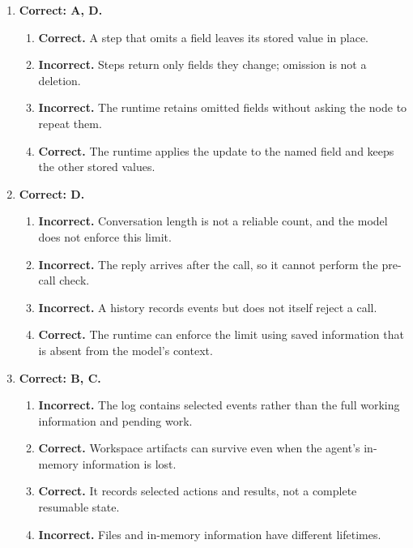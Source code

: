 \begin{enumerate}[start=11,itemsep=0.7\baselineskip]
\item[{\hyperref[exercise:11]{11.}}] \begin{minipage}[t]{\linewidth}
\textbf{Correct: A, D.}
\begin{enumerate}[label=\textnormal{(\Alph*)},leftmargin=*,itemsep=0pt]
\item \textbf{Correct.} A step that omits a field leaves its stored value in place.
\item \textbf{Incorrect.} Steps return only fields they change; omission is not a deletion.
\item \textbf{Incorrect.} The runtime retains omitted fields without asking the node to repeat them.
\item \textbf{Correct.} The runtime applies the update to the named field and keeps the other stored values.
\end{enumerate}
\end{minipage}

\item[{\hyperref[exercise:12]{12.}}] \begin{minipage}[t]{\linewidth}
\textbf{Correct: D.}
\begin{enumerate}[label=\textnormal{(\Alph*)},leftmargin=*,itemsep=0pt]
\item \textbf{Incorrect.} Conversation length is not a reliable count, and the model does not enforce this limit.
\item \textbf{Incorrect.} The reply arrives after the call, so it cannot perform the pre-call check.
\item \textbf{Incorrect.} A history records events but does not itself reject a call.
\item \textbf{Correct.} The runtime can enforce the limit using saved information that is absent from the model's context.
\end{enumerate}
\end{minipage}

\item[{\hyperref[exercise:13]{13.}}] \begin{minipage}[t]{\linewidth}
\textbf{Correct: B, C.}
\begin{enumerate}[label=\textnormal{(\Alph*)},leftmargin=*,itemsep=0pt]
\item \textbf{Incorrect.} The log contains selected events rather than the full working information and pending work.
\item \textbf{Correct.} Workspace artifacts can survive even when the agent's in-memory information is lost.
\item \textbf{Correct.} It records selected actions and results, not a complete resumable state.
\item \textbf{Incorrect.} Files and in-memory information have different lifetimes.
\end{enumerate}
\end{minipage}


\end{enumerate}
